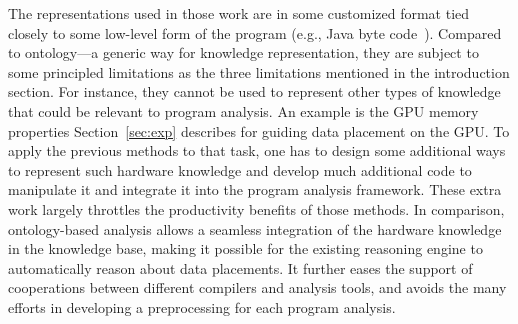 The representations used in those work are in some customized format
tied closely to some low-level form of the program (e.g., Java byte
code~\cite{benton2007interactive}). Compared to ontology---a generic
way for knowledge representation, they are subject to some principled
limitations as the three limitations mentioned in the introduction
section. For instance, they cannot be used to represent other types of
knowledge that could be relevant to program analysis. An example is
the GPU memory properties Section~\ref{sec:exp} describes for guiding
data placement on the GPU. To apply the previous methods to that task,
one has to design some additional ways to represent such hardware
knowledge and develop much additional code to manipulate it and
integrate it into the program analysis framework. These extra work
largely throttles the productivity benefits of those methods. In
comparison, ontology-based analysis allows a seamless integration of
the hardware knowledge in the knowledge base, making it possible for
the existing reasoning engine to automatically reason about data
placements. It further eases the support of cooperations between different
compilers and analysis tools, and avoids the many efforts in
developing a preprocessing for each program analysis. 

